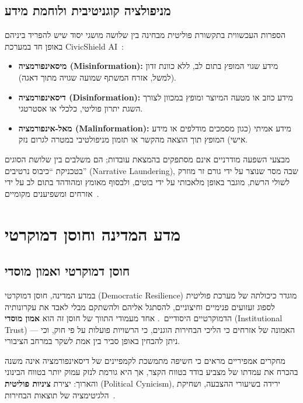 \subsection{מניפולציה קוגניטיבית ולוחמת מידע}

הספרות העכשווית בתקשורת פוליטית מבחינה בין שלושה מושגי יסוד שיש להפריד ביניהם באופן חד במערכת \textenglish{CivicShield AI}~\cite{wardle2017information}:

\begin{itemize}
    \item \textbf{מיסאינפורמציה (\textenglish{Misinformation}):} מידע שגוי המופץ בתום לב, ללא כוונת זדון (למשל, אזרח המשתף שמועה שגויה מתוך דאגה).
    \item \textbf{דיסאינפורמציה (\textenglish{Disinformation}):} מידע כוזב או מטעה המיוצר ומופץ במכוון לצורך השגת יתרון פוליטי, כלכלי או אסטרטגי.
    \item \textbf{מאל-אינפורמציה (\textenglish{Malinformation}):} מידע אמיתי (כגון מסמכים מודלפים או מידע אישי) המופץ תוך הוצאה מהקשר או תזמון מניפולטיבי במטרה לגרום נזק.
\end{itemize}

מבצעי השפעה מודרניים אינם מסתפקים בהמצאת עובדות; הם משלבים בין שלושת הסוגים בטכניקת ``כיבוס נרטיבים'' (\textenglish{Narrative Laundering}), שבה מסר שנוצר על ידי גורם זר מוזרק לשולי הרשת, מוגבר באופן מלאכותי על ידי בוטים, ולבסוף מאומץ ומהודהד בתום לב על ידי אזרחים ומשפיענים מקומיים~\cite{nimmo2020breakout}.

\section{מדע המדינה וחוסן דמוקרטי}
\label{sec:democratic_resilience}

\subsection{חוסן דמוקרטי ואמון מוסדי}

במדע המדינה, חוסן דמוקרטי (\textenglish{Democratic Resilience}) מוגדר כיכולתה של מערכת פוליטית לספוג זעזועים פנימיים וחיצוניים, להסתגל אליהם ולהשתקם מבלי לאבד את עקרונותיה הדמוקרטיים היסודיים~\cite{merkel2021resilience}. אחד מעמודי התווך של חוסן זה הוא \textbf{אמון מוסדי} (\textenglish{Institutional Trust}) --- האמונה של אזרחים כי הליכי הבחירות הוגנים, כי הרשויות פועלות על פי חוק, וכי ניתן להבחין באופן סביר בין אמת לשקר במרחב הציבורי.

מחקרים אמפיריים מראים כי חשיפה מתמשכת לקמפיינים של דיסאינפורמציה אינה משנה בהכרח את עמדתו של מצביע בודד בטווח הקצר, אך היא גורמת לנזק עמוק יותר בטווח הבינוני והארוך: יצירת \textbf{ציניות פוליטית} (\textenglish{Political Cynicism}), ירידה בשיעורי ההצבעה, ושחיקת הלגיטימציה של תוצאות הבחירות~\cite{bennett2018disinformation}.

